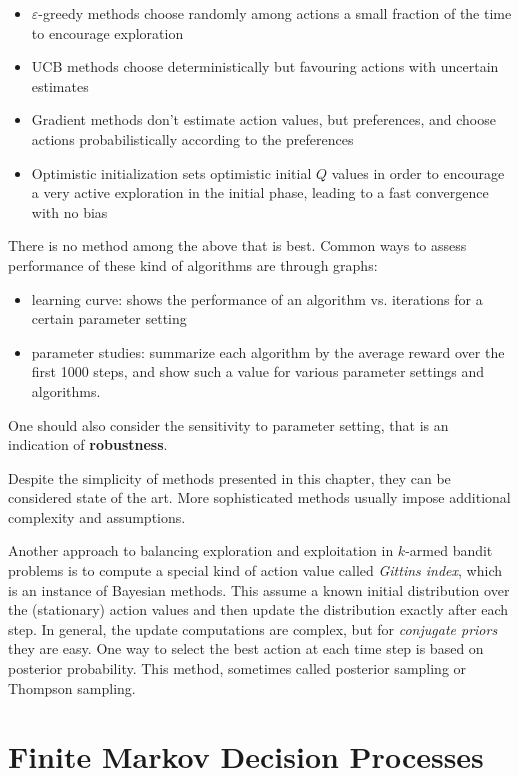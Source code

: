 \documentclass[lang=en,mode=geye,device=normal,color=blue,14pt]{elegantnote}
\DeclareMathOperator*{\1}{\mathbbm{1}}
\begin{document}
\begin{itemize}
\item $\varepsilon$-greedy methods choose randomly among actions a small fraction of the time to encourage exploration
\item UCB methods choose deterministically but favouring actions with uncertain estimates
\item Gradient methods don't estimate action values, but preferences, and choose actions probabilistically according to the preferences
\item Optimistic initialization sets optimistic initial $Q$ values in order to encourage a very active exploration in the initial phase, leading to a fast convergence with no bias
\end{itemize}

There is no method among the above that is best. Common ways to assess performance of these kind of algorithms are through graphs:
\begin{itemize}
\item learning curve: shows the performance of an algorithm vs. iterations for a certain parameter setting
\item parameter studies: summarize each algorithm by the average reward over the first 1000 steps, and show such a value for various parameter settings and algorithms.
\end{itemize}

One should also consider the sensitivity to parameter setting, that is an indication of \textbf{robustness}.

Despite the simplicity of methods presented in this chapter, they can be considered state of the art. More sophisticated methods usually impose additional complexity and assumptions.

Another approach to balancing exploration and exploitation in $k$-armed bandit problems is to compute a special kind of action value called \textit{Gittins index}, which is an instance of Bayesian methods. This assume a known initial distribution over the (stationary) action values and then update the distribution exactly after each step.
In general, the update computations are complex, but for \textit{conjugate priors} they are easy.
One way to select the best action at each time step is based on posterior probability.
This method, sometimes called posterior sampling or Thompson sampling.

\newpage
\section{Finite Markov Decision Processes}
\end{document}
